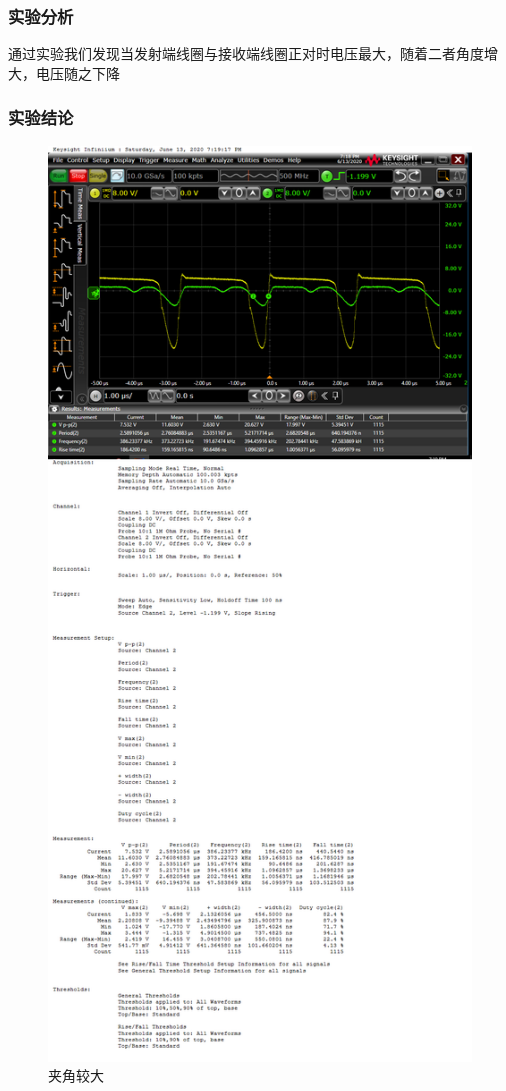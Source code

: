 \documentclass[conference]{IEEEtran}
\theoremstyle{break}
\begin{document}
\subsubsection{实验分析}
通过实验我们发现当发射端线圈与接收端线圈正对时电压最大，随着二者角度增大，电压随之下降
\subsubsection{实验结论}
\begin{figure}[htbp]
        \centerline{\includegraphics[scale=0.1]{角度1.png}}
        \caption{夹角较大}
        \label{fig}
        \end{figure}       
\end{document}

